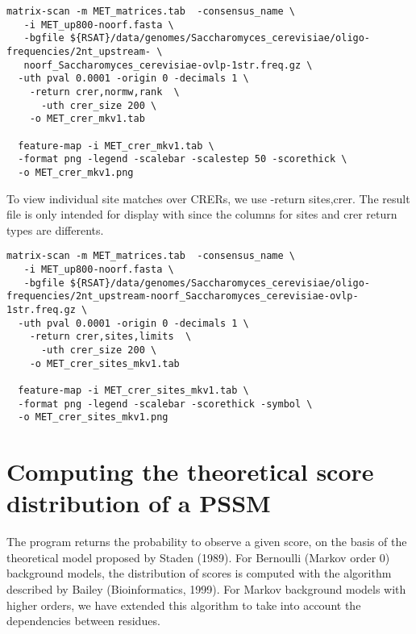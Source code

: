 {\color{Blue} \begin{footnotesize} 
\begin{verbatim}
matrix-scan -m MET_matrices.tab  -consensus_name \
   -i MET_up800-noorf.fasta \
   -bgfile ${RSAT}/data/genomes/Saccharomyces_cerevisiae/oligo-frequencies/2nt_upstream- \
   noorf_Saccharomyces_cerevisiae-ovlp-1str.freq.gz \
  -uth pval 0.0001 -origin 0 -decimals 1 \
    -return crer,normw,rank  \
      -uth crer_size 200 \
    -o MET_crer_mkv1.tab
   
  feature-map -i MET_crer_mkv1.tab \
  -format png -legend -scalebar -scalestep 50 -scorethick \
  -o MET_crer_mkv1.png    

\end{verbatim} \end{footnotesize}
}

To view individual site matches over CRERs, we use -return sites,crer. The result file is only intended for display with  since the columns for sites and crer return types are differents.

{\color{Blue} \begin{footnotesize} 
\begin{verbatim}
matrix-scan -m MET_matrices.tab  -consensus_name \
   -i MET_up800-noorf.fasta \
   -bgfile ${RSAT}/data/genomes/Saccharomyces_cerevisiae/oligo-frequencies/2nt_upstream-noorf_Saccharomyces_cerevisiae-ovlp-1str.freq.gz \
  -uth pval 0.0001 -origin 0 -decimals 1 \
    -return crer,sites,limits  \
      -uth crer_size 200 \
    -o MET_crer_sites_mkv1.tab
   
  feature-map -i MET_crer_sites_mkv1.tab \
  -format png -legend -scalebar -scorethick -symbol \
  -o MET_crer_sites_mkv1.png    

\end{verbatim} \end{footnotesize}
}

\section{Computing the theoretical score distribution of a PSSM}

The program \program{matrix-distrib} returns the probability to observe a given score, on
the basis of the theoretical model proposed by Staden (1989). For Bernoulli (Markov order 0) background models, the distribution of scores is computed with the algorithm described by Bailey (Bioinformatics, 1999). For Markov background models with higher orders, we have extended this algorithm to take into account the dependencies between residues.


